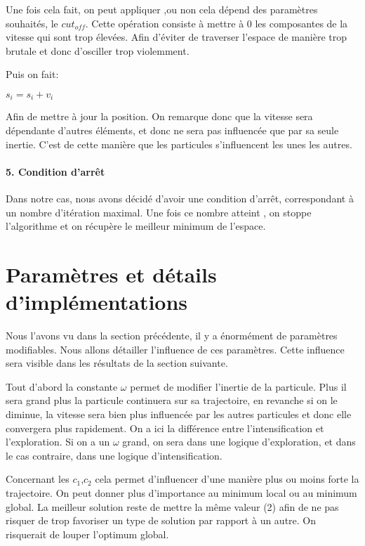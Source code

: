 \documentclass[a4paper, 11pt]{article}
\begin{document}
Une fois cela fait, on peut appliquer ,ou non cela dépend des paramètres souhaités, le $cut_{off}$. 
Cette opération consiste à mettre à 0 les composantes de la vitesse qui sont
trop élevées. Afin d'éviter de traverser l'espace de manière trop brutale et donc d'osciller trop violemment.

Puis on fait:
\begin{center}
 \begin{math}
  s_i = s_i + v_i
 \end{math}
\end{center}

Afin de mettre à jour la position. On remarque donc que la vitesse sera dépendante d'autres éléments, et donc ne sera pas influencée que
par sa seule inertie. C'est de cette manière que les particules s'influencent les unes les autres.

\paragraph{5. Condition d'arrêt}
Dans notre cas, nous avons décidé d'avoir une condition d'arrêt, correspondant à un nombre d'itération maximal. Une fois ce nombre atteint
, on stoppe l'algorithme et on récupère le meilleur minimum de l'espace.

\section{Paramètres et détails d'implémentations}
Nous l'avons vu dans la section précédente, il y a énormément de paramètres modifiables. Nous allons détailler l'influence de ces 
paramètres. Cette influence sera visible dans les résultats de la section suivante.

Tout d'abord la constante $\omega$ permet de modifier l'inertie de la particule. Plus il sera grand plus la particule continuera sur 
sa trajectoire, en revanche si on le diminue, la vitesse sera bien plus influencée par les autres particules et donc elle convergera
plus rapidement.
On a ici la différence entre l'intensification et l'exploration. Si on a un $\omega$ grand, on sera dans une logique d'exploration, 
et dans le cas contraire, dans une logique d'intensification.

Concernant les $c_1$,$c_2$ cela permet d'influencer d'une manière plus ou moins forte la trajectoire. On peut donner plus d'importance 
au minimum local ou au minimum global. La meilleur solution reste de mettre la même valeur (2) afin de ne pas risquer de trop favoriser
un type de solution par rapport à un autre. On risquerait de louper l'optimum global.
\end{document}
